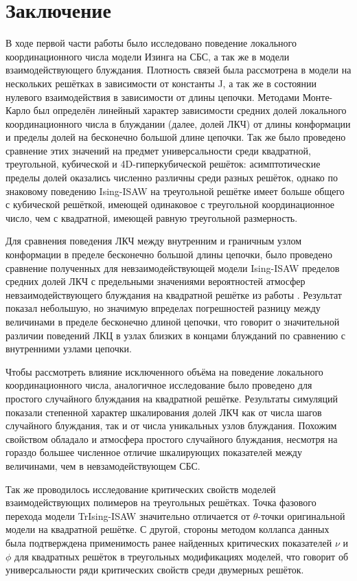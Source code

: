 \section{Заключение}

В ходе первой части работы было исследовано поведение локального координационного числа модели Изинга на СБС, а так же в модели взаимодействующего блуждания.
Плотность связей была рассмотрена в модели на нескольких решётках в зависимости от константы J,
а так же в состоянии нулевого взаимодействия в зависимости от длины цепочки.
Методами Монте-Карло был определён линейный характер зависимости средних долей локального координационного числа в блуждании (далее, долей ЛКЧ) от длины конформации и пределы долей на бесконечно большой длине цепочки.
Так же было проведено сравнение этих значений на предмет универсальности среди квадратной, треугольной, кубической и 4D-гиперкубической решёток: 
асимптотические пределы долей оказались численно различны среди разных решёток, однако по знаковому поведению Ising-ISAW на треугольной решётке имеет больше общего с кубической решёткой, имеющей одинаковое с треугольной координационное число, чем с квадратной, имеющей равную треугольной размерность. 

Для сравнения поведения ЛКЧ между внутренним и граничным узлом конформации в пределе бесконечно большой длины цепочки,
было проведено сравнение полученных для невзаимодействующей модели Ising-ISAW пределов средних долей ЛКЧ с предельными значениями вероятностей атмосфер невзаимодействующего блуждания на квадратной решётке из работы \cite{owczarek2008scaling}. 
Результат показал небольшую, но значимую впределах погрешностей разницу между величинами в пределе бесконечно длиной цепочки, 
что говорит о значительной различии поведений ЛКЦ в узлах близких в концами блужданий по сравнению с внутренними узлами цепочки. 

Чтобы рассмотреть влияние исключенного объёма на поведение локального координационного числа, аналогичное исследование было проведено для простого случайного блуждания на квадратной решётке.
Результаты симуляций показали степенной характер шкалирования долей ЛКЧ как от числа шагов случайного блуждания, 
так и от числа уникальных узлов блуждания.
Похожим свойством обладало и атмосфера простого случайного блуждания, 
несмотря на гораздо большее численное отличие шкалирующих показателей между величинами, чем в невзамодействующем СБС.

Так же проводилось исследование критических свойств моделей взаимодействующих полимеров на треугольных решётках.
Точка фазового перехода модели TrIsing-ISAW значительно отличается от $\theta$-точки оригинальной модели на квадратной решётке. 
С другой, стороны методом коллапса данных была подтверждена применимость ранее найденных критических показателей $\nu$ и $\phi$ для квадратных решёток в треугольных модификациях моделей, что говорит об универсальности ряди критических свойств среди двумерных решёток.